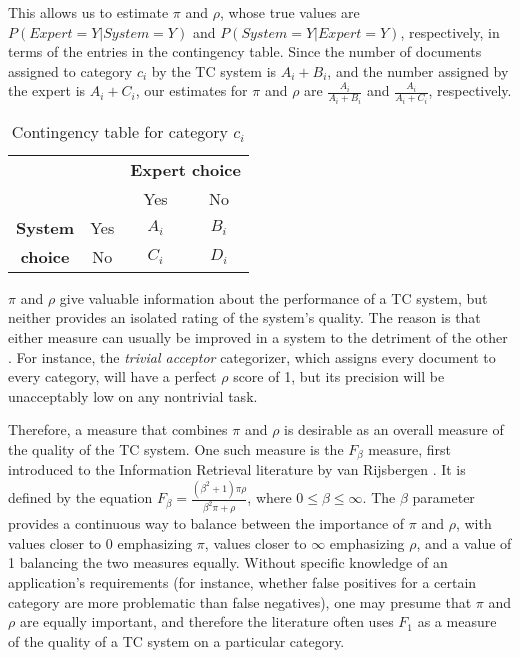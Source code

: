 This allows us to estimate $\pi$ and $\rho$, whose true values are
$P(Expert=Y | System=Y)$ and $P(System=Y | Expert=Y)$, respectively,
in terms of the entries in the contingency table.  Since the number of
documents assigned to category $c_i$ by the TC system is $A_i+B_i$,
and the number assigned by the expert is $A_i+C_i$, our estimates for
$\pi$ and $\rho$ are $\frac{A_i}{A_i + B_i}$ and $\frac{A_i}{A_i +
C_i}$, respectively.



\begin{table}
\begin{center}
\begin{tabular}{|c|c|c|c|}
\cline{3-4}
\multicolumn{2}{c|}{} & \multicolumn{2}{c|}{\textbf{Expert choice}} \\
\cline{3-4}
\multicolumn{2}{c|}{} & Yes & No \\
\hline
\textbf{System} & Yes & $A_i$ & $B_i$ \\
\cline{2-4}
\textbf{choice} & No  & $C_i$ & $D_i$ \\
\hline
\end{tabular}
\end{center}
\caption{Contingency table for category $c_i$}
\label{onecat-contingency}
\end{table}


$\pi$ and $\rho$ give valuable information about the performance of a
TC system, but neither provides an isolated rating of the system's
quality.  The reason is that either measure can usually be improved in
a system to the detriment of the other \cite[p. 35]{sebastiani:02}. For
instance, the \emph{trivial acceptor} categorizer, which assigns every
document to every category, will have a perfect $\rho$ score of 1, but
its precision will be unacceptably low on any nontrivial task.

Therefore, a measure that combines $\pi$ and $\rho$ is desirable as an
overall measure of the quality of the TC system.  One such measure is
the $F_\beta$ measure, first introduced to the Information Retrieval
literature by van Rijsbergen \cite[ch. 7]{rijsbergen:79}.  It is
defined by the equation $F_\beta = \frac{(\beta^2 + 1)\pi\rho}{\beta^2
\pi + \rho}$, where $0 \leq \beta \leq \infty$.  The $\beta$ parameter
provides a continuous way to balance between the importance of $\pi$
and $\rho$, with values closer to 0 emphasizing $\pi$, values closer
to $\infty$ emphasizing $\rho$, and a value of 1 balancing the two
measures equally.  Without specific knowledge of an application's
requirements (for instance, whether false positives for a certain
category are more problematic than false negatives), one may presume
that $\pi$ and $\rho$ are equally important, and therefore the
literature often uses $F_1$ as a measure of the quality of a TC system
on a particular category.

